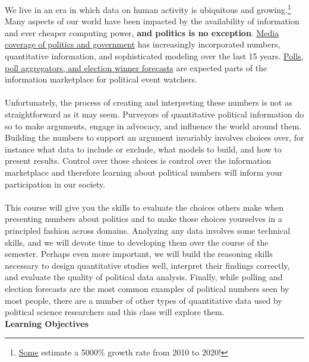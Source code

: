 \documentclass[12pt]{article}
\begin{document}
\noindent We live in an era in which data on human activity is ubiquitous and growing.\footnote{\href{https://www.forbes.com/sites/gilpress/2021/12/30/54-predictions-about-the-state-of-data-in-2021/?sh=7e0d7e36397d}{\color{blue}\underline{Some}} estimate a 5000\% growth rate from 2010 to 2020!}  Many aspects of our world have been impacted by the availability of information and ever cheaper computing power, \textbf{and politics is no exception}.  \href{https://fivethirtyeight.com/politics/}{Media coverage of politics and government} has increasingly incorporated numbers, quantitative information, and sophisticated modeling over the last 15 years.  \href{https://projects.fivethirtyeight.com/biden-approval-rating/?ex_cid=rrpromo}{Polls, poll aggregators, and election winner forecasts} are expected parts of the information marketplace for political event watchers.\\
\\
\noindent Unfortunately, the process of creating and interpreting these numbers is not as straightforward as it may seem.  Purveyors of quantitative political information do so to make arguments, engage in advocacy, and influence the world around them.  Building the numbers to support an argument invariably involves choices over, for instance what data to include or exclude, what models to build, and how to present results.  Control over those choices is control over the information marketplace and therefore learning about political numbers will inform your participation in our society.\\
\\
\noindent This course will give you the skills to evaluate the choices others make when presenting numbers about politics and to make those choices yourselves in a principled fashion across domains.  Analyzing any data involves some technical skills, and we will devote time to developing them over the course of the semester.  Perhaps even more important, we will build the reasoning skills necessary to design quantitative studies well, interpret their findings correctly, and evaluate the quality of political data analysis. Finally, while polling and election forecasts are the most common examples of political numbers seen by most people, there are a number of other types of quantitative data used by political science researchers and this class will explore them.\\



\noindent \Large \textbf{Learning Objectives}\normalsize\\
\end{document}
